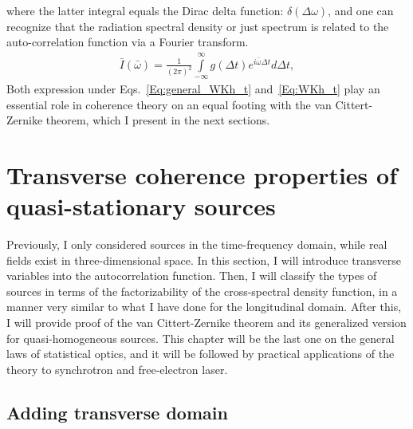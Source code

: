     where the latter integral equals the Dirac delta function: $\delta(\Delta \omega)$, and one can recognize that the radiation spectral density or just spectrum is related to the auto-correlation function via a Fourier transform.
    \begin{align}
        \bar{I}(\bar{\omega}) = \frac{1}{(2 \pi)^2} \int \limits_{-\infty}^{\infty}  g(\Delta t) e^{i \bar{\omega} \Delta t} d \Delta t,
        \label{Eq:WKh_t}
    \end{align}
    Both expression under Eqs.~\ref{Eq:general_WKh_t} and~\ref{Eq:WKh_t} play an essential role in coherence theory on an equal footing with the van Cittert-Zernike theorem, which I present in the next sections.

\section{Transverse coherence properties of quasi-stationary sources}
\label{Sec:Transverse coherence properties of quasi-stationary sources}
    
    Previously, I only considered sources in the time-frequency domain, while real fields exist in three-dimensional space. In this section, I will introduce transverse variables into the autocorrelation function. Then, I will classify the types of sources in terms of the factorizability of the cross-spectral density function, in a manner very similar to what I have done for the longitudinal domain. After this, I will provide proof of the van Cittert-Zernike theorem and its generalized version for quasi-homogeneous sources. This chapter will be the last one on the general laws of statistical optics, and it will be followed by practical applications of the theory to synchrotron and free-electron laser.

\subsection{Adding transverse domain}

